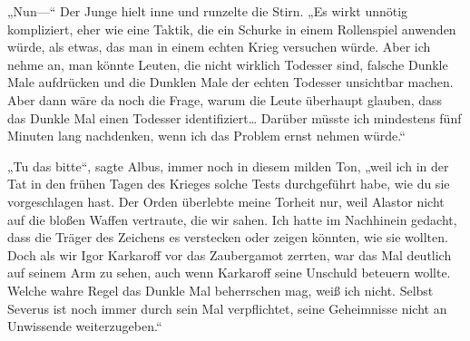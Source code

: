 „Nun—“ Der Junge hielt inne und runzelte die Stirn. „Es wirkt unnötig kompliziert, eher wie eine Taktik, die ein Schurke in einem Rollenspiel anwenden würde, als etwas, das man in einem echten Krieg versuchen würde. Aber ich nehme an, man könnte Leuten, die nicht wirklich Todesser sind, falsche Dunkle Male aufdrücken und die Dunklen Male der echten Todesser unsichtbar machen. Aber dann wäre da noch die Frage, warum die Leute überhaupt glauben, dass das Dunkle Mal einen Todesser identifiziert… Darüber müsste ich mindestens fünf Minuten lang nachdenken, wenn ich das Problem ernst nehmen würde.“

„Tu das bitte“, sagte Albus, immer noch in diesem milden Ton, „weil ich in der Tat in den frühen Tagen des Krieges solche Tests durchgeführt habe, wie du sie vorgeschlagen hast. Der Orden überlebte meine Torheit nur, weil Alastor nicht auf die bloßen Waffen vertraute, die wir sahen. Ich hatte im Nachhinein gedacht, dass die Träger des Zeichens es verstecken oder zeigen könnten, wie sie wollten. Doch als wir Igor Karkaroff vor das Zaubergamot zerrten, war das Mal deutlich auf seinem Arm zu sehen, auch wenn Karkaroff seine Unschuld beteuern wollte. Welche wahre Regel das Dunkle Mal beherrschen mag, weiß ich nicht. Selbst Severus ist noch immer durch sein Mal verpflichtet, seine Geheimnisse nicht an Unwissende weiterzugeben.“

